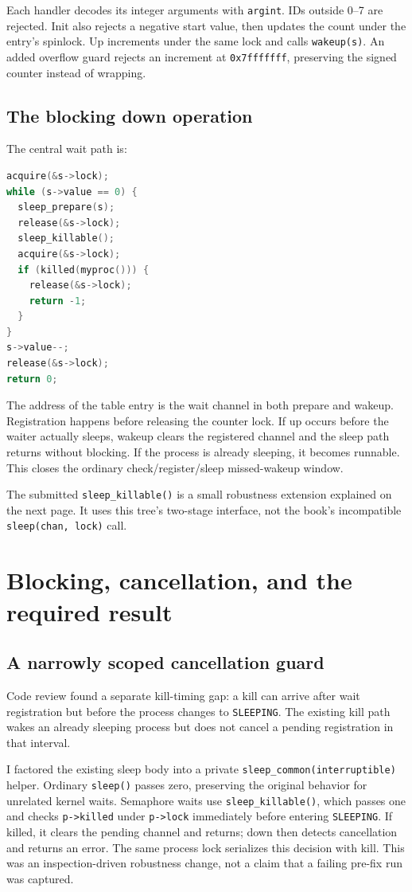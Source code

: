 \documentclass[12pt]{article}
\begin{document}
Each handler decodes its integer arguments with \texttt{argint}. IDs outside
0--7 are rejected. Init also rejects a negative start value, then updates
the count under the entry's spinlock. Up increments under the same lock
and calls \texttt{wakeup(s)}. An added overflow guard rejects an increment
at \texttt{0x7fffffff}, preserving the signed counter instead of wrapping.

\subsection{The blocking down operation}
The central wait path is:
\begin{lstlisting}[language=C]
acquire(&s->lock);
while (s->value == 0) {
  sleep_prepare(s);
  release(&s->lock);
  sleep_killable();
  acquire(&s->lock);
  if (killed(myproc())) {
    release(&s->lock);
    return -1;
  }
}
s->value--;
release(&s->lock);
return 0;
\end{lstlisting}
The address of the table entry is the wait channel in both prepare and
wakeup. Registration happens before releasing the counter lock. If up
occurs before the waiter actually sleeps, wakeup clears the registered
channel and the sleep path returns without blocking. If the process is
already sleeping, it becomes runnable. This closes the ordinary
check/register/sleep missed-wakeup window.

The submitted \texttt{sleep\_killable()} is a small robustness extension
explained on the next page. It uses this tree's two-stage interface, not
the book's incompatible \texttt{sleep(chan, lock)} call.

\clearpage
\section{Blocking, cancellation, and the required result}
\subsection{A narrowly scoped cancellation guard}
Code review found a separate kill-timing gap: a kill can arrive after
wait registration but before the process changes to \texttt{SLEEPING}.
The existing kill path wakes an already sleeping process but does not
cancel a pending registration in that interval.

I factored the existing sleep body into a private
\texttt{sleep\_common(interruptible)} helper. Ordinary \texttt{sleep()}
passes zero, preserving the original behavior for unrelated kernel waits.
Semaphore waits use \texttt{sleep\_killable()}, which passes one and checks
\texttt{p->killed} under \texttt{p->lock} immediately before entering
\texttt{SLEEPING}. If killed, it clears the pending channel and returns;
down then detects cancellation and returns an error. The same process
lock serializes this decision with kill. This was an inspection-driven
robustness change, not a claim that a failing pre-fix run was captured.
\end{document}
